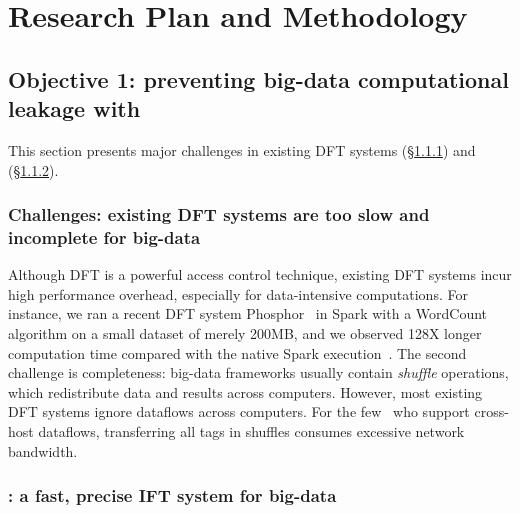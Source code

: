 \vspace{-.15in}\section{Research Plan and Methodology}
\label{sec:plan}

% 

\vspace{-.15in}\subsection{Objective 1: 
preventing big-data computational leakage with \kakute}\label{sec:obj1}
\vspace{-.075in}
This section presents major challenges in existing DFT systems 
(\S\ref{sec:ift-problem}) and \kakute (\S\ref{sec:kakute}).

\vspace{-.15in}
\subsubsection{Challenges: existing DFT systems are too slow and incomplete for 
big-data} 
\label{sec:ift-problem}\vspace{-.075in}

Although DFT is a powerful access control technique, existing DFT systems incur 
high performance overhead, especially for data-intensive computations. For 
instance, we ran a recent DFT system Phosphor~\cite{oo14:phosphor} in Spark 
with a WordCount algorithm on a small dataset of merely 200MB, and we observed 
128X longer computation time compared with the native Spark 
execution~\cite{kakute:acsac17}. The second challenge is completeness: 
big-data frameworks usually contain \emph{shuffle} operations, which 
redistribute data and results across computers. However, most existing DFT 
systems ignore dataflows across computers. For the 
few~\cite{cloudfence:raid13} who support cross-host dataflows, transferring all 
tags in shuffles consumes excessive network bandwidth.

\vspace{-.15in}\subsubsection{\kakute: a fast, precise IFT system for big-data} 
\label{sec:kakute}\vspace{-.075in}


